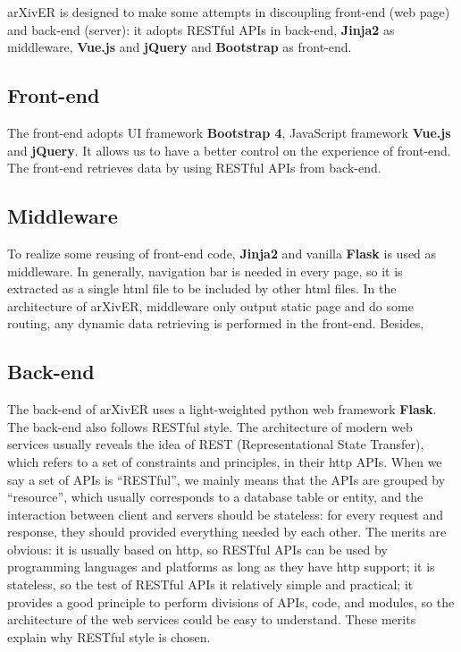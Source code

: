 \documentclass[letterpaper,12pt]{article}
\begin{document}
    arXivER is designed to make some attempts in discoupling front-end (web page) and back-end (server): it adopts RESTful APIs in back-end, \textbf{Jinja2} as middleware, \textbf{Vue.js} and \textbf{jQuery} and \textbf{Bootstrap} as front-end.
    
    
    \subsection{Front-end}
    The front-end adopts UI framework \textbf{Bootstrap 4}, JavaScript framework \textbf{Vue.js} and \textbf{jQuery}. It allows us to have a better control on the experience of front-end. The front-end retrieves data by using RESTful APIs from back-end.
    
    \subsection{Middleware}
    To realize some reusing of front-end code, \textbf{Jinja2} and vanilla \textbf{Flask} is used as middleware. In generally, navigation bar is needed in every page, so it is extracted as a single html file to be included by other html files. In the architecture of arXivER, middleware only output static page and do some routing, any dynamic data retrieving is performed in the front-end. Besides, 
    
    \subsection{Back-end}
    The back-end of arXivER uses a light-weighted python web framework \textbf{Flask}.
    The back-end also follows RESTful style.
    The architecture of modern web services usually reveals the idea of REST (Representational State Transfer), which refers to a set of constraints and principles, in their http APIs.
    When we say a set of APIs is ``RESTful'', we mainly means that the APIs are grouped by ``resource'', which usually corresponds to a database table or entity, and the interaction between client and servers should be stateless: for every request and response, they should provided everything needed by each other. The merits are obvious: it is usually based on http, so RESTful APIs can be used by programming languages and platforms as long as they have http support; it is stateless, so the test of RESTful APIs it relatively simple and practical; it provides a good principle to perform divisions of APIs, code, and modules, so the architecture of the web services could be easy to understand. These merits explain why RESTful style is chosen.
    
\end{document}
